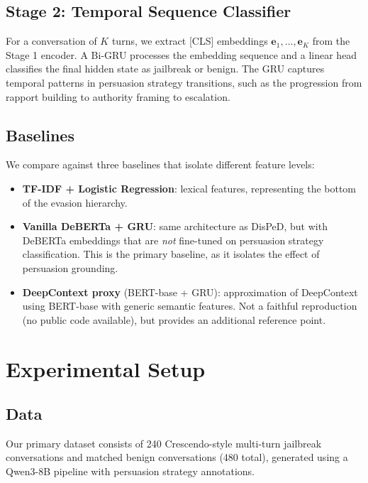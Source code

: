 \documentclass[11pt,a4paper]{article}
\begin{document}
\subsection{Stage 2: Temporal Sequence Classifier}

For a conversation of $K$ turns, we extract [CLS] embeddings $\mathbf{e}_1, \ldots, \mathbf{e}_K$ from the Stage 1 encoder.
A Bi-GRU processes the embedding sequence and a linear head classifies the final hidden state as jailbreak or benign.
The GRU captures temporal patterns in persuasion strategy transitions, such as the progression from rapport building to authority framing to escalation.

\subsection{Baselines}

We compare against three baselines that isolate different feature levels:
\begin{itemize}[nosep]
\item \textbf{TF-IDF + Logistic Regression}: lexical features, representing the bottom of the evasion hierarchy.
\item \textbf{Vanilla DeBERTa + GRU}: same architecture as DisPeD, but with DeBERTa embeddings that are \emph{not} fine-tuned on persuasion strategy classification. This is the primary baseline, as it isolates the effect of persuasion grounding.
\item \textbf{DeepContext proxy} (BERT-base + GRU): approximation of DeepContext \citep{deepcontext2026} using BERT-base with generic semantic features. Not a faithful reproduction (no public code available), but provides an additional reference point.
\end{itemize}

\section{Experimental Setup}

\subsection{Data}

Our primary dataset consists of 240 Crescendo-style multi-turn jailbreak conversations and matched benign conversations (480 total), generated using a Qwen3-8B pipeline with persuasion strategy annotations.
\end{document}
